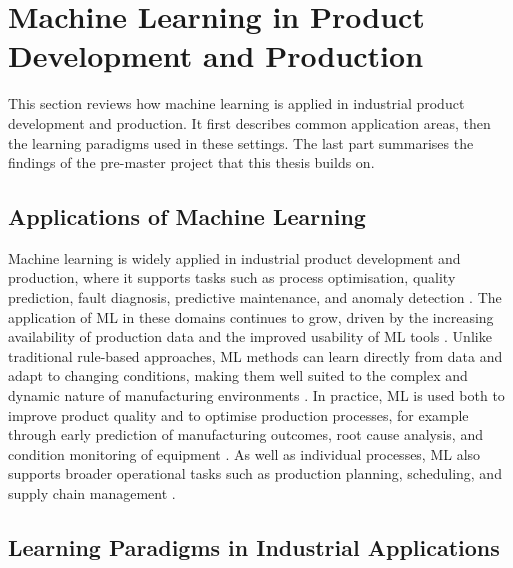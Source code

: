 \section{Machine Learning in Product Development and Production}
\label{sec:ml-in-product-development-and-production}

This section reviews how machine learning is applied in industrial
product development and production. It first describes common
application areas, then the learning paradigms used in these
settings. The last part summarises the findings of the pre-master
project that this thesis builds on.

\subsection{Applications of Machine Learning}
\label{sec:applications-of-machine-learning}

Machine learning is widely applied in industrial product development and production, 
where it supports tasks such as process optimisation, quality prediction, fault diagnosis, 
predictive maintenance, and anomaly detection 
\parencite{wuest2016ml_manufacturing, plathottam2023review_ai_manufacturing}. 
The application of ML in these domains continues to grow, 
driven by the increasing availability of production data and the improved usability of ML tools 
\parencite{wuest2016ml_manufacturing}. 
Unlike traditional rule-based approaches, ML methods can learn directly from data 
and adapt to changing conditions, making them well suited to the complex and dynamic 
nature of manufacturing environments \parencite{wuest2016ml_manufacturing}. 
In practice, ML is used both to improve product quality and to optimise production processes, 
for example through early prediction of manufacturing outcomes, root cause analysis, 
and condition monitoring of equipment \parencite{weichert2019review_ml_optimization_production}. 
As well as individual processes, ML also supports broader operational tasks such as 
production planning, scheduling, and supply chain management 
\parencite{plathottam2023review_ai_manufacturing, presciuttini2024ml_iot_manufacturing_operations}.

\subsection{Learning Paradigms in Industrial Applications}
\label{sec:learning-paradigms-in-industrial-applications}


